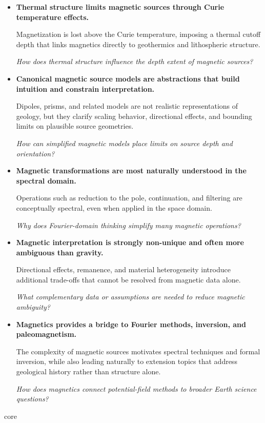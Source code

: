 {\begin{itemize}
    \textit{Under what geological conditions is the induced-field assumption most likely to fail?}

    \item \textbf{Thermal structure limits magnetic sources through Curie temperature effects.}

    Magnetization is lost above the Curie temperature, imposing a thermal cutoff depth that links magnetics directly to geothermics and lithospheric structure.

    \textit{How does thermal structure influence the depth extent of magnetic sources?}

    \item \textbf{Canonical magnetic source models are abstractions that build intuition and constrain interpretation.}

    Dipoles, prisms, and related models are not realistic representations of geology, but they clarify scaling behavior, directional effects, and bounding limits on plausible source geometries.

    \textit{How can simplified magnetic models place limits on source depth and orientation?}

    \item \textbf{Magnetic transformations are most naturally understood in the spectral domain.}

    Operations such as reduction to the pole, continuation, and filtering are conceptually spectral, even when applied in the space domain.

    \textit{Why does Fourier-domain thinking simplify many magnetic operations?}

    \item \textbf{Magnetic interpretation is strongly non-unique and often more ambiguous than gravity.}

    Directional effects, remanence, and material heterogeneity introduce additional trade-offs that cannot be resolved from magnetic data alone.

    \textit{What complementary data or assumptions are needed to reduce magnetic ambiguity?}

    \item \textbf{Magnetics provides a bridge to Fourier methods, inversion, and paleomagnetism.}

    The complexity of magnetic sources motivates spectral techniques and formal inversion, while also leading naturally to extension topics that address geological history rather than structure alone.

    \textit{How does magnetics connect potential-field methods to broader Earth science questions?}
\end{itemize}
}{core}

